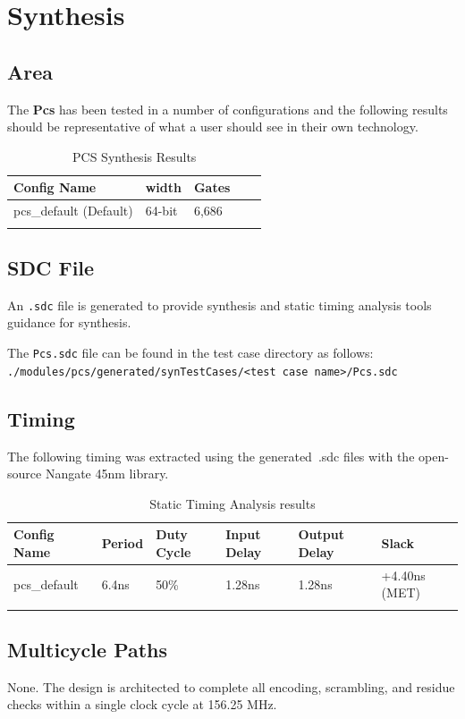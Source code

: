 \section{Synthesis}

\subsection{Area}

The \textbf{Pcs} has been tested in a number of configurations and the
following results should be representative of what a user should see in their
own technology.

\renewcommand*{\arraystretch}{1.4}
\begin{longtable}[H]{
    | p{}
    | p{}
    | p{}
    | p{}
    | p{} |
  }
  \hline
  \textbf{Config Name} &
  \textbf{width}       &
  \textbf{Gates}         \\ \hline \hline

  pcs\_default (Default)  & 
  64-bit              & 
  6,686               \\ \hline

  \caption{PCS Synthesis Results}\label{table:area}
\end{longtable}

\subsection{SDC File}
An \texttt{.sdc} file is generated to provide synthesis and static timing
analysis tools guidance for synthesis.

The \texttt{Pcs.sdc} file can be found in the test case directory as follows: \\
\texttt{./modules/pcs/generated/synTestCases/<test case name>/Pcs.sdc}

\subsection{Timing}

The following timing was extracted using the generated~.sdc files with the
open-source Nangate 45nm library.

\renewcommand*{\arraystretch}{1.4}
\begin{longtable}[H]{
    | p{}
    | p{}
    | p{}
    | p{}
    | p{}
    | p{} |
  }
  \hline
  \textbf{Config Name}  &
  \textbf{Period}       &
  \textbf{Duty Cycle}   &
  \textbf{Input Delay}  &
  \textbf{Output Delay} &
  \textbf{Slack}          \\ \hline \hline

  pcs\_default          &
  6.4ns                 &
  50\% & 
  1.28ns & 
  1.28ns & 
  +4.40ns (MET)         \\ \hline


  \caption{Static Timing Analysis results}\label{table:timing}
\end{longtable}


\subsection{Multicycle Paths}
None. The design is architected to complete all encoding, scrambling, and residue checks within a single clock cycle at 156.25 MHz.